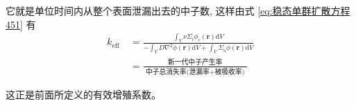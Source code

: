 \documentclass{Sichuan Normal University}
\begin{document}
它就是单位时间内从整个表面泄漏出去的中子数, 这样由式 \eqref{eq:稳态单群扩散方程451} 有
\begin{equation}
\begin{aligned}
k_{\text {eff }} & =\frac{\int_V \nu \Sigma_i \phi_c(\boldsymbol{r}) \mathrm{d} V}{-\int_V D \nabla^2 \phi(\boldsymbol{r}) \mathrm{d} V+\int_V \Sigma_{\mathrm{a}} \phi(\boldsymbol{r}) \mathrm{d} V} \\
& =\frac{\text { 新一代中子产生率 }}{\text { 中子总消失率(泄漏率+被吸收率) }}
\end{aligned}
\end{equation}

这正是前面所定义的有效增殖系数。







    
\end{document}
